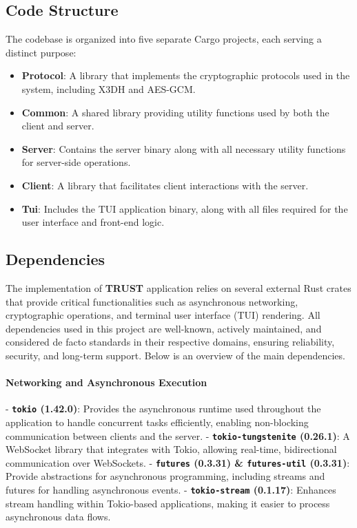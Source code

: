\subsection{Code Structure}
The codebase is organized into five separate Cargo projects, each serving a distinct purpose:
\begin{itemize}
    \item \textbf{Protocol}: A library that implements the cryptographic protocols used in the system, including X3DH and AES-GCM.
    \item \textbf{Common}: A shared library providing utility functions used by both the client and server.
    \item \textbf{Server}: Contains the server binary along with all necessary utility functions for server-side operations.
    \item \textbf{Client}: A library that facilitates client interactions with the server.
    \item \textbf{Tui}: Includes the TUI application binary, along with all files required for the user interface and front-end logic.
\end{itemize}
\subsection{Dependencies}
\label{sec:Dependecies}
The implementation of \textbf{TRUST} application relies on several external Rust crates that provide critical functionalities such as asynchronous networking, cryptographic operations, and terminal user interface (TUI) rendering. All dependencies used in this project are well-known, actively maintained, and considered de facto standards in their respective domains, ensuring reliability, security, and long-term support. Below is an overview of the main dependencies.   

\paragraph{Networking and Asynchronous Execution}  
- \textbf{\texttt{tokio} (1.42.0)}: Provides the asynchronous runtime used throughout the application to handle concurrent tasks efficiently, enabling non-blocking communication between clients and the server.  
- \textbf{\texttt{tokio-tungstenite} (0.26.1)}: A WebSocket library that integrates with Tokio, allowing real-time, bidirectional communication over WebSockets.  
- \textbf{\texttt{futures} (0.3.31) \& \texttt{futures-util} (0.3.31)}: Provide abstractions for asynchronous programming, including streams and futures for handling asynchronous events.  
- \textbf{\texttt{tokio-stream} (0.1.17)}: Enhances stream handling within Tokio-based applications, making it easier to process asynchronous data flows.  

